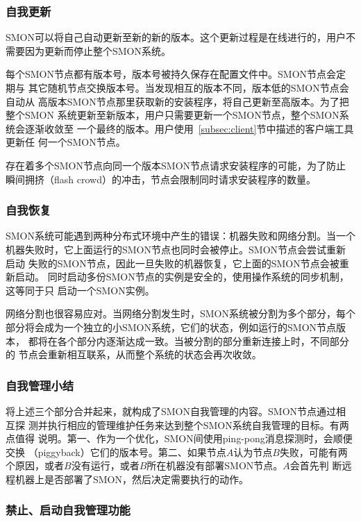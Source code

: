 \subsubsection*{自我更新}

SMON可以将自己自动更新至新的新的版本。这个更新过程是在线进行的，用户不
需要因为更新而停止整个SMON系统。

每个SMON节点都有版本号，版本号被持久保存在配置文件中。SMON节点会定期与
其它随机节点交换版本号。当发现相互的版本不同，版本低的SMON节点会自动从
高版本SMON节点那里获取新的安装程序，将自己更新至高版本。为了把整个SMON
系统更新至新版本，用户只需要更新一个SMON节点，整个SMON系统会逐渐收敛至
一个最终的版本。用户使用~\ref{subsec:client}节中描述的客户端工具更新任
何一个SMON节点。

存在着多个SMON节点向同一个版本SMON节点请求安装程序的可能，为了防止
瞬间拥挤（flash crowd）的冲击，节点会限制同时请求安装程序的数量。

\subsubsection*{自我恢复}

SMON系统可能遇到两种分布式环境中产生的错误：机器失败和网络分割。当一个
机器失败时，它上面运行的SMON节点也同时会被停止。SMON节点会尝试重新启动
失败的SMON节点，因此一旦失败的机器恢复，它上面的SMON节点会被重新启动。
同时启动多份SMON节点的实例是安全的，使用操作系统的同步机制，这等同于只
启动一个SMON实例。

网络分割也很容易应对。当网络分割发生时，SMON系统被分割为多个部分，每个
部分将会成为一个独立的小SMON系统，它们的状态，例如运行的SMON节点版本，
都将在各个部分内逐渐达成一致。当被分割的部分重新连接上时，不同部分的
节点会重新相互联系，从而整个系统的状态会再次收敛。

\subsubsection*{自我管理小结}

将上述三个部分合并起来，就构成了SMON自我管理的内容。SMON节点通过相互探
测并执行相应的管理维护任务来达到整个SMON系统自我管理的目标。有两点值得
说明。第一、作为一个优化，SMON间使用ping-pong消息探测时，会顺便交换
（piggyback）它们的版本号。第二、如果节点$A$认为节点$B$失败，可能有两
个原因，或者$B$没有运行，或者$B$所在机器没有部署SMON节点。$A$会首先判
断远程机器上是否部署了SMON，然后决定需要执行的动作。

\subsubsection*{禁止、启动自我管理功能}

